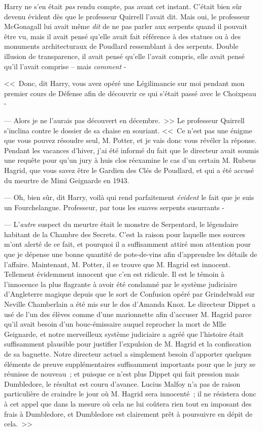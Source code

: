 Harry ne s'en était \emph{pas} rendu compte, pas avant cet instant. C'était bien sûr devenu évident dès que le professeur Quirrell l'avait dit. Mais oui, le professeur McGonagall lui avait même \emph{dit} de ne pas parler aux serpents quand il pouvait être vu, mais il avait pensé qu'elle avait fait référence à des statues ou à des monuments architecturaux de Poudlard ressemblant à des serpents. Double illusion de transparence, il avait pensé qu'elle l'avait compris, elle avait pensé qu'il l'avait comprise -- mais \emph{comment} -

<<~Donc, dit Harry, vous avez opéré une Légilimancie sur moi pendant mon premier cours de Défense afin de découvrir ce qui s'était passé avec le Choixpeau -

--- Alors je ne l'aurais pas découvert en décembre.~>> Le professeur Quirrell s'inclina contre le dossier de sa chaise en souriant. <<~Ce n'est pas une énigme que vous pouvez résoudre seul, M. Potter, et je vais donc vous révéler la réponse. Pendant les vacances d'hiver, j'ai été informé du fait que le directeur avait soumis une requête pour qu'un jury à huis clos réexamine le cas d'un certain M. Rubeus Hagrid, que vous savez être le Gardien des Clés de Poudlard, et qui a été accusé du meurtre de Mimi Geignarde en 1943.

--- Oh, bien sûr, dit Harry, voilà qui rend parfaitement \emph{évident} le fait que je suis un Fourchelangue. Professeur, par tous les suaves serpents susurrants -

--- L'\emph{autre} suspect du meurtre était le monstre de Serpentard, le légendaire habitant de la Chambre des Secrets. C'est la raison pour laquelle mes sources m'ont alerté de ce fait, et pourquoi il a suffisamment attiré mon attention pour que je dépense une bonne quantité de pots-de-vins afin d'apprendre les détails de l'affaire. Maintenant, M. Potter, il se trouve que M. Hagrid est innocent. Tellement évidemment innocent que c'en est ridicule. Il est le témoin à l'innocence la plus flagrante à avoir été condamné par le système judiciaire d'Angleterre magique depuis que le sort de Confusion opéré par Grindelwald sur Neville Chamberlain a été mis sur le dos d'Amanda Knox. Le directeur Dippet a usé de l'un des élèves comme d'une marionnette afin d'accuser M. Hagrid parce qu'il avait besoin d'un bouc-émissaire auquel reprocher la mort de Mlle Geignarde, et notre merveilleux système judiciaire a agréé que l'histoire était suffisamment plausible pour justifier l'expulsion de M. Hagrid et la confiscation de sa baguette. Notre directeur actuel a simplement besoin d'apporter quelques éléments de preuve supplémentaires suffisamment importants pour que le jury se réunisse de nouveau~; et puisque ce n'est plus Dippet qui fait pression mais Dumbledore, le résultat est couru d'avance. Lucius Malfoy n'a pas de raison particulière de craindre le jour où M. Hagrid sera innocenté~; il ne résistera donc à cet appel que dans la mesure où cela ne lui coûtera rien tout en imposant des frais à Dumbledore, et Dumbledore est clairement prêt à poursuivre en dépit de cela.~>>

